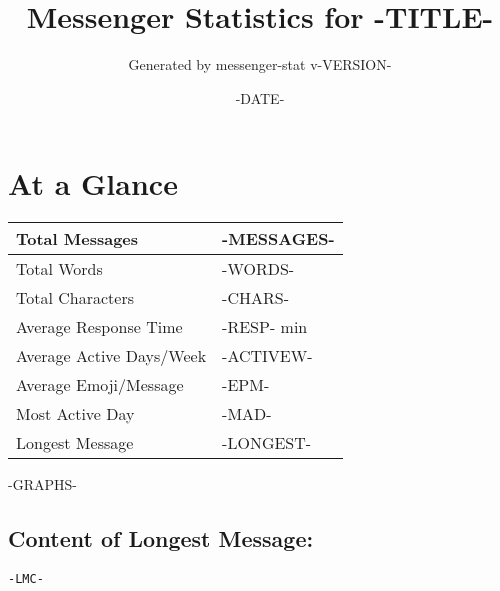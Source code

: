 \documentclass[11pt]{article}
\title{Messenger Statistics for -TITLE-}
\author{Generated by messenger-stat v-VERSION-}
\date{-DATE-}
\begin{document}
\maketitle

\section*{At a Glance}
\begin{center}
    \begin{tabularx}{\textwidth}{ | X | p{6cm} | }
    \hline
        Total Messages & -MESSAGES- \\ \hline
        Total Words & -WORDS- \\ \hline
        Total Characters & -CHARS- \\ \hline
        Average Response Time & -RESP- min \\ \hline
        Average Active Days/Week & -ACTIVEW- \\ \hline
        Average Emoji/Message & -EPM- \\ \hline
        Most Active Day & -MAD- \\ \hline
        Longest Message & -LONGEST- \\
    \hline
    \end{tabularx}
\end{center}

\clearpage
-GRAPHS-

\subsection*{Content of Longest Message:}
\begin{verbatim}
-LMC-
\end{verbatim}
\end{document}
